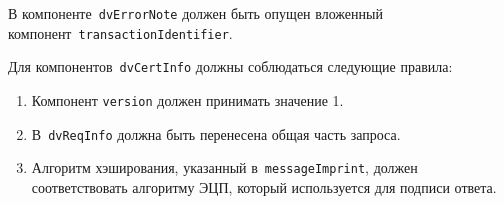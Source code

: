 В компоненте~\texttt{dvErrorNote} должен быть опущен вложенный 
компонент~\texttt{transactionIdentifier}.
	
Для компонентов~\texttt{dvCertInfo} должны соблюдаться следующие правила:
\begin{enumerate}
\item
Компонент \texttt{version} должен принимать значение 1.
\item
В~\texttt{dvReqInfo} должна быть перенесена общая часть запроса. 
\item
Алгоритм хэширования, указанный в~\texttt{messageImprint},
должен соответствовать алгоритму ЭЦП, который используется для 
подписи ответа.
\end{enumerate}
